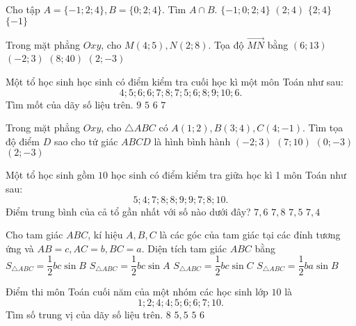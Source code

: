 \begin{ex}%
	Cho tập $A=\{-1; 2; 4\}, B=\{0; 2; 4\}$. Tìm $A \cap B$.
	\choice
	{$\{-1 ; 0 ; 2 ; 4\}$}
	{$(2; 4)$}
	{\True $\{2; 4\}$}
	{$\{-1\}$}
\end{ex}
\begin{ex}%
Trong mặt phẳng $Oxy$, cho $M(4; 5), N(2; 8)$. Tọa độ $\vec{MN}$ bằng
	\choice
	{$(6; 13)$}
	{\True $(-2; 3)$}
	{$(8; 40)$}
	{$(2;-3)$}
\end{ex}
\begin{ex}%
	Một tổ học sinh học sinh có điểm kiểm tra cuối học kì một môn Toán như sau: $$4 ; 5 ; 6 ; 6 ; 7 ; 8 ; 7 ; 5 ; 6 ; 8 ; 9 ; 10 ; 6.$$ Tìm mốt của dãy số liệu trên.
	\choice
	{$9$}
	{$5$}
	{\True $6$}
	{$7$}
\end{ex}
\begin{ex}%
Trong mặt phẳng $Oxy$, cho $\triangle A B C$ có $A(1; 2), B(3; 4), C(4;-1)$. Tìm tọa độ điểm $D$ sao cho tứ giác $ABCD$ là hình bình hành
	\choice
	{ $(-2; 3)$}
	{$(7; 10)$}
	{$(0 ;-3)$}
	{\True $(2 ;-3)$}
\end{ex}
\begin{ex}%
Một tổ học sinh gồm $10$ học sinh có điểm kiểm tra giữa học kì 1 môn Toán như sau: $$5 ; 4 ; 7 ; 8 ; 8 ; 9 ; 9 ; 7 ; 8 ; 10.$$ Điểm trung bình của cả tổ gần nhất với số nào dưới đây?
	\choice
	{$7{,}6$}
	{$7{,}8$}
	{\True$7{,}5$}
	{$7{,}4$}
\end{ex}
\begin{ex}%
Cho tam giác $ABC$, kí hiệu $A, B, C$ là các góc của tam giác tại các đỉnh tương ứng và $AB=c, AC=b, BC=a$. Diện tích tam giác $ABC$ bằng
	\choice
	{$S_{\triangle ABC}=\dfrac{1}{2} b c \sin B$}
	{\True $S_{\triangle ABC}=\dfrac{1}{2} b c \sin A$}
	{$S_{\triangle ABC}=\dfrac{1}{2} b c \sin C$}
	{$S_{\triangle ABC}=\dfrac{1}{2} b a \sin B$}
\end{ex}
\begin{ex}%
Điểm thi môn Toán cuối năm của một nhóm các học sinh lớp $10$ là $$1;2;4;4;5;6;6;7;10.$$ Tìm số trung vị của dãy số liệu trên.
	\choice
	{$8$}
	{$5{,}5$}
	{\True $5$}
	{$6$}
\end{ex}



